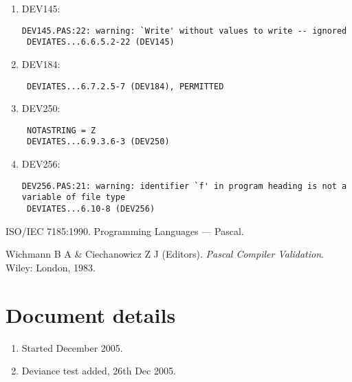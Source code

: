\documentclass[a4paper]{article}
\begin{document}
\begin{enumerate}
    \item DEV145: 
        \begin{small}\begin{verbatim}
DEV145.PAS:22: warning: `Write' without values to write -- ignored
 DEVIATES...6.6.5.2-22 (DEV145)
        \end{verbatim}\end{small}

    \item DEV184: 
        \begin{small}\begin{verbatim}
 DEVIATES...6.7.2.5-7 (DEV184), PERMITTED
        \end{verbatim}\end{small}

    \item DEV250: 
        \begin{small}\begin{verbatim}
 NOTASTRING = Z
 DEVIATES...6.9.3.6-3 (DEV250)
        \end{verbatim}\end{small}

    \item DEV256: 
        \begin{small}\begin{verbatim}
DEV256.PAS:21: warning: identifier `f' in program heading is not a variable of file type
 DEVIATES...6.10-8 (DEV256)
        \end{verbatim}\end{small}

\end{enumerate}

\begin{thebibliography}{99}
    
ISO/IEC 7185:1990. Programming Languages --- Pascal.

Wichmann B A \& Ciechanowicz Z J (Editors). \emph{Pascal Compiler Validation}. Wiley: London, 1983.


\end{thebibliography}

\appendix

\section{Document details}

\begin{enumerate}
\item Started December 2005.
\item Deviance test added, 26th Dec 2005.
\end{enumerate}
\end{document}
